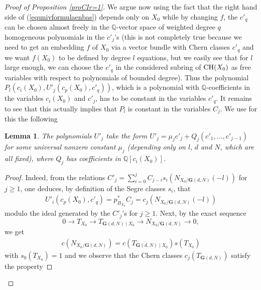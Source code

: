 \documentclass[10pt]{article}
\newtheorem{lemm}[theo]{Lemma}
\begin{document}
\begin{proof}[Proof of Proposition \ref{proCIr=1}]
We argue now using the fact that the right hand side of (\ref{equnivformulaenbas})  depends only on $X_0$ while by changing $f$, the
$c'_q$ can be chosen almost freely in the $\mathbb{Q}$-vector space of weighted degree $q$ homogeneous polynomials in the $c'_j$'s (this is not completely true because
we need to get an embedding $f$ of $X_0$ via a vector bundle with Chern classes $c'_q$ and we want
$f(X_0)$ to be defined by degree $l$ equations, but we easily see that for $l$ large enough, we can choose the
$c'_q$ in the considered subring of  ${\rm CH}(X_0)$ as free variables with respect to polynomials of bounded degree). Thus
the  polynomial  $P_l(c_i(X_0),U'_j(c_p(X_0),c'_q))$, which is a polynomial with
$\mathbb{Q}$-coefficients in the variables $c_i(X_0)$ and  $c'_j$, has to be constant in
the variables $c'_q$.
It remains to see that this actually implies  that $P_l$ is constant in  the variables  $C_j$.
 We use for this the following
\begin{lemm}\label{leallurepol} The polynomials $U'_j$ take the form $U'_j=\mu_j c'_j+Q_j(c'_1,\ldots,c'_{j-1})$  for some universal nonzero constant
$\mu_j$ (depending only on $l,\,d$ and $N$, which are all fixed), where $Q_j$ has coefficients in $\mathbb{Q}[c_i(X_0)]$.
\end{lemm}
\begin{proof} Indeed, from the
relations
$C'_j=\sum_{i=0}^{j}C_{j-i} s_i(N_{X_0/\mathbf{G}(d,N)}(-l))$ for $j\geq 1$, one deduces, by definition of the Segre classes $s_i$, that \begin{eqnarray}\label{eqnewdu11aout} U'_i(c_p(X_0),c'_q)=p_{B_{X_0}}^*C_j=c_j(N_{X_0/\mathbf{G}(d,N)}(-l))\end{eqnarray} modulo the ideal generated by the
$C'_j$'s for $j\geq 1$. Next, by the
exact sequence
$$0\rightarrow T_{X_0}\rightarrow T_{\mathbf{G}(d,N)\mid X_0}\rightarrow N_{X_0/\mathbf{G}(d,N)}
\rightarrow 0,$$
we get
\begin{eqnarray}\label{eqraj20juin19}c(N_{X_0/\mathbf{G}(d,N)})=c(T_{\mathbf{G}(d,N)\mid X_0})s(T_{X_0})
\end{eqnarray}
with $s_0(T_{X_0})=1$ and we observe that the Chern classes $c_j(T_{\mathbf{G}(d,N)})$ satisfy the property


\end{proof}
\end{proof}
\end{document}
